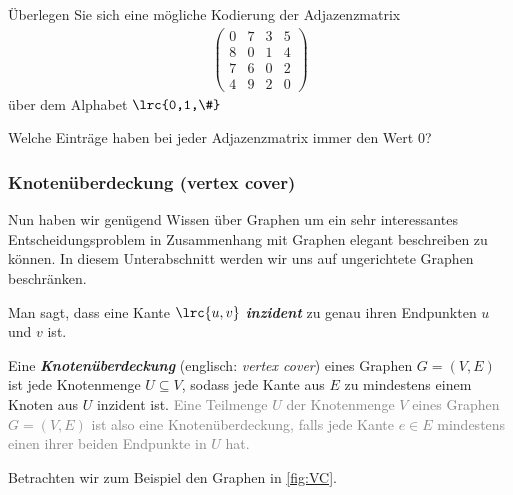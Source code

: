 \begin{myexercise}\label{myexercise:0300}
	Überlegen Sie sich eine mögliche Kodierung der Adjazenzmatrix
	\begin{align*}
		\left( \begin{matrix} 0 & 7 & 3 & 5 \\ 8 & 0 & 1 & 4 \\ 7 & 6 & 0 & 2 \\ 4 & 9 & 2 & 0 \end{matrix} \right)
	\end{align*}
	über dem Alphabet $\lrc{0,1,\#}$
\end{myexercise}

\begin{myexercise}\label{myexercise:0301}
	Welche Einträge haben bei jeder Adjazenzmatrix immer den Wert 0?
\end{myexercise}

\subsubsection{Knotenüberdeckung (vertex cover)}
Nun haben wir genügend Wissen über Graphen um ein sehr interessantes Entscheidungsproblem in Zusammenhang mit Graphen elegant beschreiben zu können. In diesem Unterabschnitt werden wir uns auf ungerichtete Graphen beschränken.
\begin{mydefinition}\label{mydefinition:knotenueberdeckung}
Man sagt, dass eine Kante $\lrc{u,v}$ \textbf{\textit{inzident}} zu genau ihren Endpunkten $u$ und $v$ ist.

Eine \textbf{\textit{Knotenüberdeckung}} (englisch: \textit{vertex cover}) eines Graphen $G = (V,E)$ ist jede Knotenmenge $U\subseteq V$, sodass jede Kante aus $E$ zu mindestens einem Knoten aus $U$ inzident ist.
\textcolor{Gray}{Eine Teilmenge $U$ der Knotenmenge $V$ eines Graphen $G=(V,E)$ ist also eine Knotenüberdeckung, falls jede Kante $e\in E$ mindestens einen ihrer beiden Endpunkte in $U$ hat.}
\end{mydefinition}
Betrachten wir zum Beispiel den Graphen in \cref{fig:VC}.


